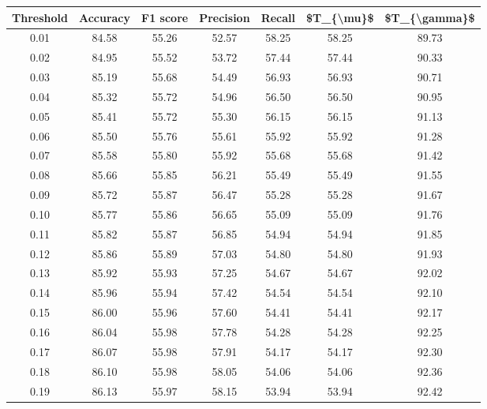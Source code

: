 \begin{tabular}{|c|c|c|c|c|c|c|}
\hline
 Threshold &  Accuracy &  F1 score &  Precision &  Recall &  \$T\_\{\textbackslash mu\}\$ &  \$T\_\{\textbackslash gamma\}\$ \\
\hline
      0.01 &     84.58 &     55.26 &      52.57 &   58.25 &      58.25 &         89.73 \\
      0.02 &     84.95 &     55.52 &      53.72 &   57.44 &      57.44 &         90.33 \\
      0.03 &     85.19 &     55.68 &      54.49 &   56.93 &      56.93 &         90.71 \\
      0.04 &     85.32 &     55.72 &      54.96 &   56.50 &      56.50 &         90.95 \\
      0.05 &     85.41 &     55.72 &      55.30 &   56.15 &      56.15 &         91.13 \\
      0.06 &     85.50 &     55.76 &      55.61 &   55.92 &      55.92 &         91.28 \\
      0.07 &     85.58 &     55.80 &      55.92 &   55.68 &      55.68 &         91.42 \\
      0.08 &     85.66 &     55.85 &      56.21 &   55.49 &      55.49 &         91.55 \\
      0.09 &     85.72 &     55.87 &      56.47 &   55.28 &      55.28 &         91.67 \\
      0.10 &     85.77 &     55.86 &      56.65 &   55.09 &      55.09 &         91.76 \\
      0.11 &     85.82 &     55.87 &      56.85 &   54.94 &      54.94 &         91.85 \\
      0.12 &     85.86 &     55.89 &      57.03 &   54.80 &      54.80 &         91.93 \\
      0.13 &     85.92 &     55.93 &      57.25 &   54.67 &      54.67 &         92.02 \\
      0.14 &     85.96 &     55.94 &      57.42 &   54.54 &      54.54 &         92.10 \\
      0.15 &     86.00 &     55.96 &      57.60 &   54.41 &      54.41 &         92.17 \\
      0.16 &     86.04 &     55.98 &      57.78 &   54.28 &      54.28 &         92.25 \\
      0.17 &     86.07 &     55.98 &      57.91 &   54.17 &      54.17 &         92.30 \\
      0.18 &     86.10 &     55.98 &      58.05 &   54.06 &      54.06 &         92.36 \\
      0.19 &     86.13 &     55.97 &      58.15 &   53.94 &      53.94 &         92.42 \\

\end{tabular}
